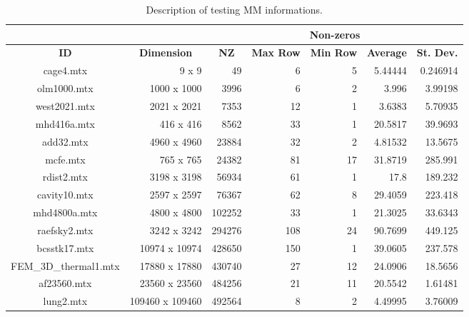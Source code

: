 	
	\begin{table}[!htp]
		\centering
		\caption{Description of testing \glsdesc{MM} informations.}
		\label{tab:matrix-info}
		\begin{adjustbox}{max width=\textwidth}
			\begin{tabular}{cr|r|r|r|r|r|}
				\cline{3-7}
				&  & \multicolumn{5}{c|}{\textbf{Non-zeros}} \\ \hline
				\multicolumn{1}{|c|}{\textbf{ID}} & \multicolumn{1}{c|}{\textbf{Dimension}} & \multicolumn{1}{c|}{\textbf{NZ}} & \multicolumn{1}{c|}{\textbf{Max Row}} & \multicolumn{1}{c|}{\textbf{Min Row}} & \multicolumn{1}{c|}{\textbf{Average}} & \multicolumn{1}{c|}{\textbf{St. Dev.}} \\ \hline \hline
				\multicolumn{1}{|c|}{cage4.mtx} & 9 x 9 & 49 & 6 & 5 & 5.44444 & 0.246914 \\ \hline
				\multicolumn{1}{|c|}{olm1000.mtx} & 1000 x 1000 & 3996 & 6 & 2 & 3.996 & 3.99198 \\ \hline
				\multicolumn{1}{|c|}{west2021.mtx} & 2021 x 2021 & 7353 & 12 & 1 & 3.6383 & 5.70935 \\ \hline
				\multicolumn{1}{|c|}{mhd416a.mtx} & 416 x 416 & 8562 & 33 & 1 & 20.5817 & 39.9693 \\ \hline
				\multicolumn{1}{|c|}{add32.mtx} & 4960 x 4960 & 23884 & 32 & 2 & 4.81532 & 13.5675 \\ \hline
				\multicolumn{1}{|c|}{mcfe.mtx} & 765 x 765 & 24382 & 81 & 17 & 31.8719 & 285.991 \\ \hline
				\multicolumn{1}{|c|}{rdist2.mtx} & 3198 x 3198 & 56934 & 61 & 1 & 17.8 & 189.232 \\ \hline
				\multicolumn{1}{|c|}{cavity10.mtx} & 2597 x 2597 & 76367 & 62 & 8 & 29.4059 & 223.418 \\ \hline
				\multicolumn{1}{|c|}{mhd4800a.mtx} & 4800 x 4800 & 102252 & 33 & 1 & 21.3025 & 33.6343 \\ \hline
				\multicolumn{1}{|c|}{raefsky2.mtx} & 3242 x 3242 & 294276 & 108 & 24 & 90.7699 & 449.125 \\ \hline
				\multicolumn{1}{|c|}{bcsstk17.mtx} & 10974 x 10974 & 428650 & 150 & 1 & 39.0605 & 237.578 \\ \hline
				\multicolumn{1}{|c|}{FEM\_3D\_thermal1.mtx} & 17880 x 17880 & 430740 & 27 & 12 & 24.0906 & 18.5656 \\ \hline
				\multicolumn{1}{|c|}{af23560.mtx} & 23560 x 23560 & 484256 & 21 & 11 & 20.5542 & 1.61481 \\ \hline
				\multicolumn{1}{|c|}{lung2.mtx} & 109460 x 109460 & 492564 & 8 & 2 & 4.49995 & 3.76009 \\ \hline

\end{tabular}
\end{adjustbox}
\end{table}
